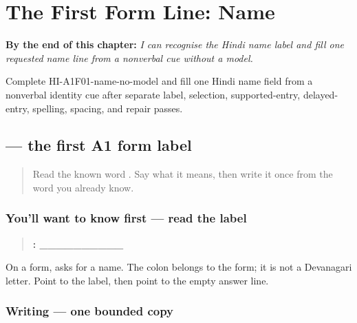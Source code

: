 
\chapter{The First Form Line: Name}
\label{ch:hi-a1-name-field}

\begin{chapteropening}
\textbf{By the end of this chapter:} \emph{I can recognise the Hindi name label and fill one requested name line from a nonverbal cue without a model.}

Complete HI-A1F01-name-no-model and fill one Hindi name field from a nonverbal identity cue after separate label, selection, supported-entry, delayed-entry, spelling, spacing, and repair passes.
\end{chapteropening}

\section[\texorpdfstring{\hi{नाम} (nām)}{नाम (nām)}]{ — the first A1 form label}

\label{lesson:HI-A1F01-name-label}



\begin{quote}
Read the known word \textbf{}. Say what it means, then write it once from the word you already know.
\end{quote}

\subsection*{You'll want to know first — read the label}
\begin{quote}
\textbf{: \_\_\_\_\_\_\_\_\_\_}
\end{quote}

On a form, \textbf{} asks for a name. The colon belongs to the form; it is not a Devanagari letter. Point to the label, then point to the empty answer line.

\subsection*{Writing — one bounded copy}

